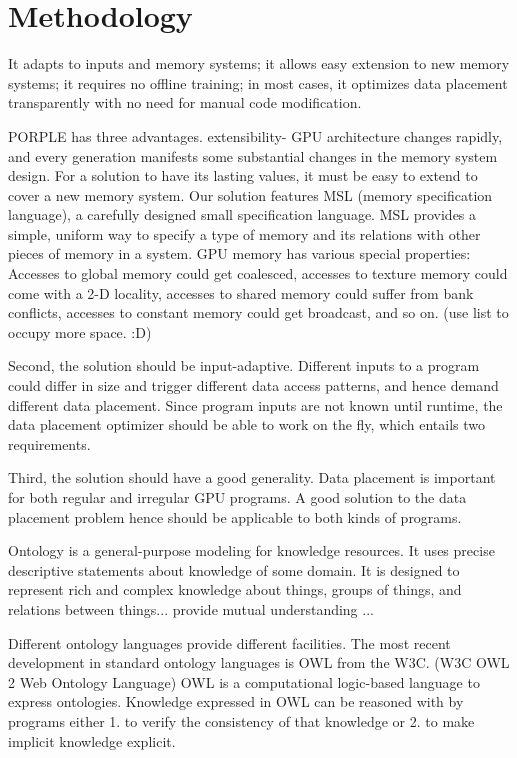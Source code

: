 \documentclass{sig-alternate}
\begin{document}
\section{Methodology}

It adapts to inputs and memory systems; it allows easy extension to new memory systems; it requires no offline training; in most cases, it optimizes data placement transparently with no need for manual code modification.

PORPLE has three advantages. 
extensibility- GPU architecture changes rapidly, and every generation manifests some substantial changes in the memory system design. For a solution to have its lasting values, it must be easy to extend to cover a new memory system. 
Our solution features MSL (memory specification language), a carefully designed small specification language. MSL provides a simple, uniform way to specify a type of memory and its relations with other pieces of memory in a system. GPU memory has various special properties: Accesses to global memory could get coalesced, accesses to texture memory could come with a 2-D locality, accesses to shared memory could suffer from bank conflicts, accesses to constant memory could get broadcast, and so on. (use list to occupy more space. :D)

Second, the solution should be input-adaptive. Different inputs to a program could differ in size and trigger different data access patterns, and hence demand different data placement. Since program inputs are not known until runtime, the data placement optimizer should be able to work on the fly, which entails two requirements. 

Third, the solution should have a good generality. Data placement is important for both regular and irregular GPU programs. A good solution to the data placement problem hence should be applicable to both kinds of programs.  
 
Ontology \cite{ontology1, ontology2} is a general-purpose modeling for knowledge resources. It uses precise descriptive statements about knowledge of some domain. It is designed to represent rich and complex knowledge about things, groups of things, and relations between things... provide mutual understanding ... 

Different ontology languages provide different facilities. The most recent development in standard ontology languages is OWL from the W3C. (W3C OWL 2 Web Ontology Language)
OWL is a computational logic-based language to express ontologies. Knowledge expressed in OWL can be reasoned with by programs either 1. to verify the consistency of that knowledge or 2. to make implicit knowledge explicit.
\end{document}
